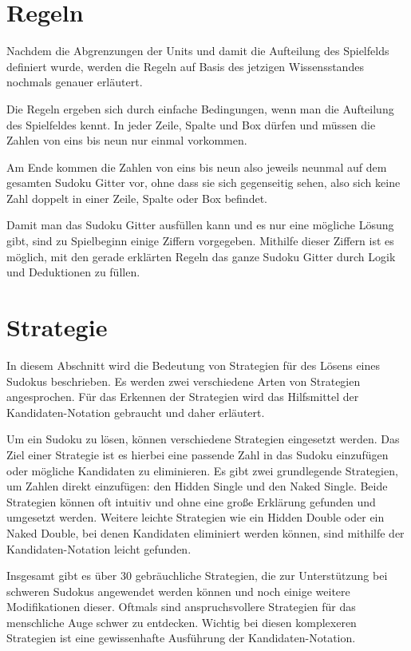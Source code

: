 \section{Regeln}
Nachdem die Abgrenzungen der Units und damit die Aufteilung des Spielfelds definiert wurde, werden die Regeln auf Basis des jetzigen Wissensstandes nochmals genauer erläutert.

Die Regeln ergeben sich durch einfache Bedingungen, wenn man die Aufteilung des Spielfeldes kennt. In jeder Zeile, Spalte und Box dürfen und müssen die Zahlen von eins bis neun nur einmal vorkommen.

Am Ende kommen die Zahlen von eins bis neun also jeweils neunmal auf dem gesamten Sudoku Gitter vor, ohne dass sie sich gegenseitig sehen, also sich keine Zahl doppelt in einer Zeile, Spalte oder Box befindet.

Damit man das Sudoku Gitter ausfüllen kann und es nur eine mögliche Lösung gibt, sind zu Spielbeginn einige Ziffern vorgegeben. Mithilfe dieser Ziffern ist es möglich, mit den gerade erklärten Regeln das ganze Sudoku Gitter durch Logik und Deduktionen zu füllen. \cite{sudopedia_2022} \cite{martin}

\section{Strategie}
In diesem Abschnitt wird die Bedeutung von Strategien für des Lösens eines Sudokus beschrieben. Es werden zwei verschiedene Arten von Strategien angesprochen. Für das Erkennen der Strategien wird das Hilfsmittel der Kandidaten-Notation gebraucht und daher erläutert.

Um ein Sudoku zu lösen, können verschiedene Strategien eingesetzt werden. Das Ziel einer Strategie ist es hierbei eine passende Zahl in das Sudoku einzufügen oder mögliche Kandidaten zu eliminieren. Es gibt zwei grundlegende Strategien, um Zahlen direkt einzufügen: den Hidden Single und den Naked Single. Beide Strategien können oft intuitiv und ohne eine große Erklärung gefunden und umgesetzt werden. Weitere leichte Strategien wie ein Hidden Double oder ein Naked Double, bei denen Kandidaten eliminiert werden können, sind mithilfe der Kandidaten-Notation leicht gefunden.

Insgesamt gibt es über 30 gebräuchliche Strategien, die zur Unterstützung bei schweren Sudokus angewendet werden können und noch einige weitere Modifikationen dieser. Oftmals sind anspruchsvollere Strategien für das menschliche Auge schwer zu entdecken. Wichtig bei diesen komplexeren Strategien ist eine gewissenhafte Ausführung der Kandidaten-Notation. \cite{martin} \cite[9]{zambon2015sudoku}

